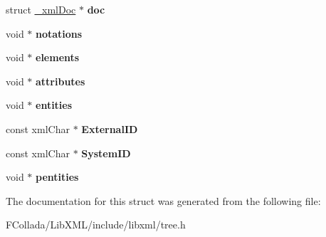 \begin{DoxyCompactItemize}
\item 
\hypertarget{struct__xmlDtd_a18f3c011bb87c79ae95bbecef3dd0b8a}{
struct \hyperlink{struct__xmlDoc}{\_\-xmlDoc} $\ast$ {\bfseries doc}}
\label{struct__xmlDtd_a18f3c011bb87c79ae95bbecef3dd0b8a}

\item 
\hypertarget{struct__xmlDtd_ad534175a81261c5f1ad7ea6392072c21}{
void $\ast$ {\bfseries notations}}
\label{struct__xmlDtd_ad534175a81261c5f1ad7ea6392072c21}

\item 
\hypertarget{struct__xmlDtd_a9a9f0ad6fe0df90737be11e9afedbcdd}{
void $\ast$ {\bfseries elements}}
\label{struct__xmlDtd_a9a9f0ad6fe0df90737be11e9afedbcdd}

\item 
\hypertarget{struct__xmlDtd_af7ff0b9a49fa0bca079e52c48d8cfb4f}{
void $\ast$ {\bfseries attributes}}
\label{struct__xmlDtd_af7ff0b9a49fa0bca079e52c48d8cfb4f}

\item 
\hypertarget{struct__xmlDtd_ad015489c07cded87195e5eeb0f6cb0b7}{
void $\ast$ {\bfseries entities}}
\label{struct__xmlDtd_ad015489c07cded87195e5eeb0f6cb0b7}

\item 
\hypertarget{struct__xmlDtd_ae44f8a5ca40e8df30f4901182278b00d}{
const xmlChar $\ast$ {\bfseries ExternalID}}
\label{struct__xmlDtd_ae44f8a5ca40e8df30f4901182278b00d}

\item 
\hypertarget{struct__xmlDtd_adf2a9eb2fe7b1129c45a78432a86e390}{
const xmlChar $\ast$ {\bfseries SystemID}}
\label{struct__xmlDtd_adf2a9eb2fe7b1129c45a78432a86e390}

\item 
\hypertarget{struct__xmlDtd_a24703d9ba5942d4cb0cf8b2c19f63243}{
void $\ast$ {\bfseries pentities}}
\label{struct__xmlDtd_a24703d9ba5942d4cb0cf8b2c19f63243}

\end{DoxyCompactItemize}


The documentation for this struct was generated from the following file:\begin{DoxyCompactItemize}
\item 
FCollada/LibXML/include/libxml/tree.h\end{DoxyCompactItemize}
